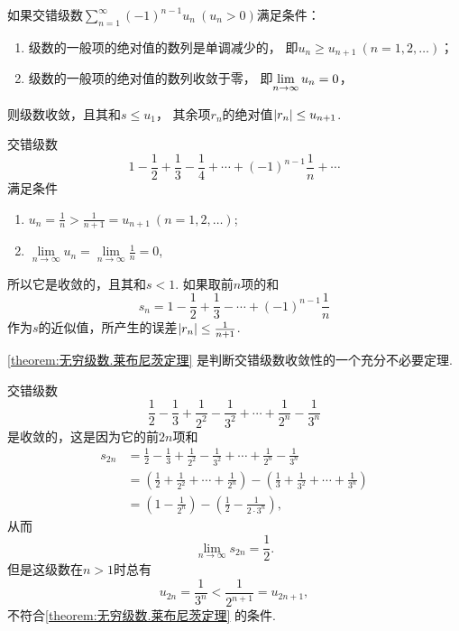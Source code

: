 \begin{theorem}[莱布尼茨定理]\label{theorem:无穷级数.莱布尼茨定理}
如果交错级数\(\sum\limits_{n=1}^\infty (-1)^{n-1} u_n\ (u_n>0)\)满足条件：
\begin{enumerate}
\item 级数的一般项的绝对值的数列是单调减少的，
即\(u_n \geq u_{n+1}\ (n=1,2,\dotsc)\)；

\item 级数的一般项的绝对值的数列收敛于零，
即\(\lim\limits_{n\to\infty} {u_n}=0\)，
\end{enumerate}
则级数收敛，且其和\(s \leq u_1\)，
其余项\(r_n\)的绝对值\(\abs{r_n} \leq u_{n+1}\).
\end{theorem}

\begin{example}\label{example:无穷级数.交错级数1}
交错级数\[
1 - \frac{1}{2} + \frac{1}{3} - \frac{1}{4} + \dotsb + (-1)^{n-1} \frac{1}{n} + \dotsb
\]满足条件\begin{enumerate}
\item \(u_n = \frac{1}{n} > \frac{1}{n+1} = u_{n+1}\ (n=1,2,\dotsc)\);
\item \(\lim\limits_{n\to\infty} u_n = \lim\limits_{n\to\infty} \frac{1}{n} = 0\),
\end{enumerate}所以它是收敛的，且其和\(s < 1\).
如果取前\(n\)项的和\[
s_n = 1 - \frac{1}{2} + \frac{1}{3} - \dotsb + (-1)^{n-1} \frac{1}{n}
\]作为\(s\)的近似值，所产生的误差\(\abs{r_n} \leq \frac{1}{n+1}\).
\end{example}

\cref{theorem:无穷级数.莱布尼茨定理} 是判断交错级数收敛性的一个充分不必要定理.
\begin{example}
交错级数\[
\frac{1}{2} - \frac{1}{3}
+ \frac{1}{2^2} - \frac{1}{3^2}
+ \dotsm + \frac{1}{2^n} - \frac{1}{3^n}
\]是收敛的，这是因为它的前\(2n\)项和\begin{align*}
s_{2n} &= \frac{1}{2} - \frac{1}{3}
+ \frac{1}{2^2} - \frac{1}{3^2}
+ \dotsm + \frac{1}{2^n} - \frac{1}{3^n} \\
&= \left(\frac{1}{2} + \frac{1}{2^2} + \dotsm + \frac{1}{2^n}\right)
 - \left(\frac{1}{3} + \frac{1}{3^2} + \dotsm + \frac{1}{3^n}\right) \\
&= \left(1 - \frac{1}{2^n}\right)
 - \left(\frac{1}{2} - \frac{1}{2\cdot3^n}\right),
\end{align*}从而\[
\lim\limits_{n\to\infty} s_{2n} = \frac{1}{2}.
\]但是这级数在\(n>1\)时总有\[
u_{2n} = \frac{1}{3^n} < \frac{1}{2^{n+1}} = u_{2n+1},
\]不符合\cref{theorem:无穷级数.莱布尼茨定理} 的条件.
\end{example}

